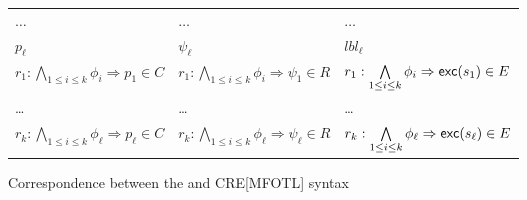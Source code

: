 \begin{figure}
\begin{tabular}{|l|l|l|}
        \qquad $\dots$
            &\qquad $\dots$
            &\qquad $\dots$ \\
        \qquad $p_\ell$
            &\qquad $\psi_\ell$
            &\qquad $lbl_\ell$ \\
    \midrule
        $r_1: \bigwedge\limits_{1 \leq i \leq k} \phi_i \Rightarrow p_1 \in C$
            & $r_1: \bigwedge\limits_{1 \leq i \leq k} \phi_i \Rightarrow \psi_1 \in R$
            & $r_1: \bigwedge\limits_{1 \leq i \leq k} \phi_i \Rightarrow \mathsf{exc}(s_1) \in E$ \\
        \dots
            & \dots
            & \dots\\
        $r_k: \bigwedge\limits_{1 \leq i \leq k} \phi_\ell\Rightarrow p_\ell \in C$
            & $r_k: \bigwedge\limits_{1 \leq i \leq k} \phi_\ell\Rightarrow \psi_\ell \in R$
            & $r_k: \bigwedge\limits_{1 \leq i \leq k} \phi_\ell\Rightarrow \mathsf{exc}(s_\ell) \in E$\\
    \bottomrule
    \end{tabular}
    \vspace{-1.8em}
    \caption{Correspondence between the \Lex{} and CRE[MFOTL] syntax
    \label{fig:lex-and-cre-correspondence}
    \cite[Figure 10]{lex}
    }
\end{figure}

